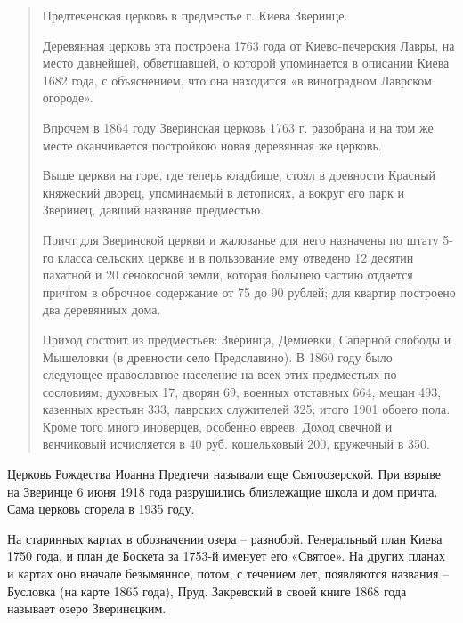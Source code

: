 \begin{quotation}
Предтеченская церковь в предместье г. Киева Зверинце.

Деревянная церковь эта построена 1763 года от Киево-печерския Лавры, на место давнейшей, обветшавшей, о которой упоминается в описании Киева 1682 года, с объяснением, что она находится «в виноградном Лаврском огороде».

Впрочем в 1864 году Зверинская церковь 1763 г. разобрана и на том же месте оканчивается постройкою новая деревянная же церковь.

Выше церкви на горе, где теперь кладбище, стоял в древности Красный княжеский дворец, упоминаемый в летописях, а вокруг его парк и Зверинец, давший название предместью. 

Причт для Зверинской церкви и жалованье для него назначены по штату 5-го класса сельских церкве и в пользование ему отведено 12 десятин пахатной и 20 сенокосной земли, которая большею частию отдается причтом в оброчное содержание от 75 до 90 рублей; для квартир построено два деревянных дома. 

Приход состоит из предместьев: Зверинца, Демиевки, Саперной слободы и Мышеловки (в древности село Предславино). В 1860 году было следующее православное население на всех этих предместьях по сословиям; духовных 17, дворян 69, военных отставных 664, мещан 493, казенных крестьян 333, лаврских служителей 325; итого 1901 обоего пола. Кроме того много иноверцев, особенно евреев. Доход свечной и венчиковый исчисляется в 40 руб. кошельковый 200, кружечный в 350.
\end{quotation}

Церковь Рождества Иоанна Предтечи называли еще Святоозерской. При взрыве на Зверинце 6 июня 1918 года разрушились близлежащие школа и дом причта. Сама церковь сгорела в 1935 году.

На старинных картах в обозначении озера – разнобой. Генеральный план Киева 1750 года, и план де Боскета за 1753-й именует его «Святое». На других планах и картах оно вначале безымянное, потом, с течением лет, появляются названия – Бусловка (на карте 1865 года), Пруд. Закревский в своей книге 1868 года называет озеро Зверинецким. 

